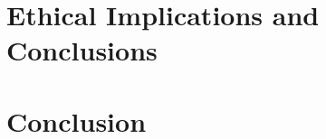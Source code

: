 \documentclass[11pt]{amsart}
\begin{document}
\section{Ethical Implications and Conclusions}




\section{Conclusion} 




\FloatBarrier %
\newpage


\end{document}
